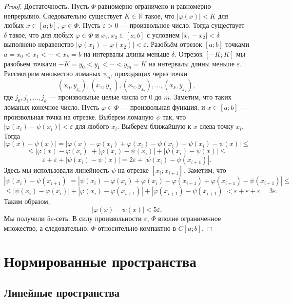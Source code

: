 \documentclass[12pt, titlepage, oneside]{amsbook}
\newcommand{\RR}{\mathbb{R}}
\theoremstyle{definition}
\theoremstyle{remark}
\begin{document}
\begin{proof}
Достаточность. Пусть $\Phi$ равномерно ограничено и равномерно непрерывно. Следовательно существует $K\in \RR$ такое, что $|\varphi(x)|<K$ для любых $x\in[a;b]$, $\varphi\in\Phi$. Пусть $\varepsilon>0$ --- произвольное число. Тогда существует $\delta$ такое, что для любых $\varphi\in\Phi$ и $x_1,x_2\in[a;b]$ с условием $|x_1-x_2|<\delta$ выполнено неравенство $|\varphi(x_1)-\varphi(x_2)|<\varepsilon$. Разобьём отрезок $[a;b]$ точками $a=x_0<x_1<\cdots<x_k=b$ на интервалы длины меньше $\delta$. Отрезок $[-K;K]$ мы разобьем точками $-K=y_0<y_1<\cdots<y_m=K$ на интервалы длины меньше $\varepsilon$. Рассмотрим множество ломаных $\psi_n$, проходящих через точки $$(x_0,y_{j_0}),(x_1,y_{j_1}),(x_2,y_{j_2}),\ldots,(x_k,y_{j_k}),$$ где $j_0,j_1,\ldots, j_k$ --- произвольные целые числа от $0$ до $m$. Заметим, что таких ломаных конечное число. Пусть $\varphi\in\Phi$ --- произвольная функция, и $x\in[a;b]$ --- произвольная точка на отрезке. Выберем ломаную $\psi$ так, что $|\varphi(x_i)-\psi(x_i)|<\varepsilon$ для любого $x_i$. Выберем ближайшую к $x$ слева точку $x_i$. Тогда $$|\varphi(x)-\psi(x)|=|\varphi(x)-\varphi(x_i)+\varphi(x_i)-\psi(x_i)+\psi(x_i)-\psi(x)|\leq$$ $$\leq|\varphi(x)-\varphi(x_i)|+|\varphi(x_i)-\psi(x_i)|+|\psi(x_i)-\psi(x)|\leq$$ $$\varepsilon+\varepsilon+|\psi(x_i)-\psi(x)|=2\varepsilon+|\psi(x_i)-\psi(x_{i+1})|.$$ Здесь мы использовали линейность $\psi$ на отрезке $[x_i;x_{i+1}]$. Заметим, что $$|\psi(x_i)-\psi(x_{i+1})|=|\psi(x_i)-\varphi(x_i)+\varphi(x_i)-\varphi(x_{i+1})+\varphi(x_{i+1})-\psi(x_{i+1})|\leq$$ $$\leq|\psi(x_i)-\varphi(x_i)|+|\varphi(x_i)-\varphi(x_{i+1})|+|\varphi(x_{i+1})-\psi(x_{i+1})|<\varepsilon+\varepsilon+\varepsilon=3\varepsilon.$$ Таким образом, $$|\varphi(x)-\psi(x)|<5\varepsilon.$$ Мы получили $5\varepsilon$-сеть. В силу произвольности $\varepsilon$, $\Phi$ вполне ограниченное множество, а следовательно, $\Phi$ относительно компактно в $C[a;b]$.
\end{proof}


\chapter{Нормированные пространства}

\section{Линейные пространства}
\end{document}
